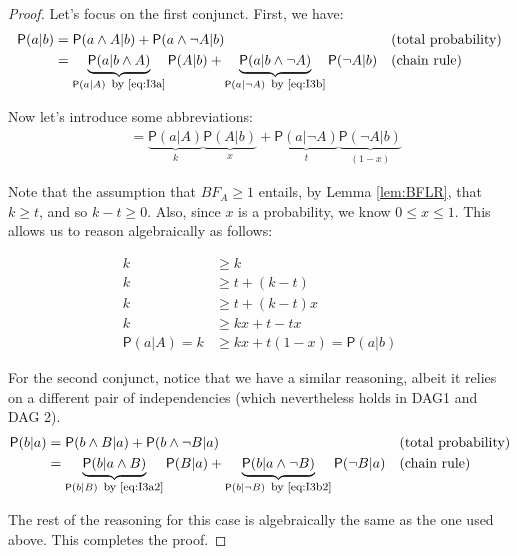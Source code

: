 \documentclass[
  10pt,
  dvipsnames,enabledeprecatedfontcommands]{scrartcl}
\newcommand{\n}{\neg}
\newcommand{\et}{\wedge}
\newcommand{\pr}[1]{\ensuremath{\mathsf{P}(#1)}}
\begin{document}
\begin{proof}

Let's focus on the first conjunct. First, we have:
\begin{align*}
\pr{a \vert b} & = \pr{a \et A \vert b} + \pr{a \et \n A \vert b} & &   (\mbox{total probability}) \\
& = \underbrace{\pr{a \vert b \et A}}_{\pr{a \vert A}  \mbox{\footnotesize \, by \eqref{eq:I3a}}} \pr{A \vert b} +
\underbrace{\pr{a \vert b \et \n A}}_{\pr{a \vert \n A} \mbox{\footnotesize \, by \eqref{eq:I3b}}}\pr{\n A \vert b}  & &   (\mbox{chain rule}) \\
\end{align*}

Now let's introduce some abbreviations:
\begin{align*}
& = \underbrace{\pr{a\vert A}}_k \underbrace{\pr{A \vert b}}_x + \underbrace{\pr{a \vert \n A}}_t \underbrace{\pr{\n A \vert b}}_{(1- x)}
\end{align*}

\noindent Note that the assumption that $BF_A\geq 1$ entails, by Lemma \ref{lem:BFLR}, that $k \geq t$, and so $k-t \geq 0$. Also, since $x$ is a probability, we know $0 \leq x \leq 1$. This allows us to reason algebraically as follows:

\begin{align*}
k & \geq k  \\
k & \geq t + (k - t) \\
k & \geq t + (k -t)x \\
k & \geq kx + t  - tx \\
\pr{a \vert A} = k & \geq kx + t(1-x) = \pr{a \vert b}
\end{align*}

For the second conjunct, notice that we have a similar reasoning, albeit it relies on a different pair of independencies (which nevertheless holds in \textsf{DAG1} and \textsf{DAG 2}).
\begin{align*}
\pr{b \vert a} & = \pr{b \et B \vert a} + \pr{b \et \n B \vert a} & &   (\mbox{total probability}) \\
& = \underbrace{\pr{b \vert a \et B}}_{\pr{b \vert B}  \mbox{\footnotesize \, by \eqref{eq:I3a2}}} \pr{B \vert a} +
\underbrace{\pr{b \vert a \et \n B}}_{\pr{b \vert \n B} \mbox{\footnotesize \, by \eqref{eq:I3b2}}}\pr{\n B \vert a}  & &   (\mbox{chain rule}) \\
\end{align*}

\noindent The rest of the reasoning for this case is algebraically the same as the one used above. This completes the proof. 
\end{proof}
\end{document}
